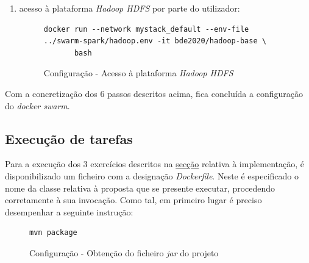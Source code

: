 \documentclass[a4paper]{report}
\begin{document}
{\begin{enumerate}[label=\textbf{\arabic*.}]
                \begin{figure}[H]
                    \centering
                    \begin{verbatim}
streamgen:
    image: streamgen
    command: hdfs:///data/title.ratings.tsv 120
    env_file:
        - ./hadoop.env
    deploy:
        mode: replicated
        replicas: 1
        placement:
            constraints:
                - "node.role==manager"
                    \end{verbatim}
                    \vspace{-5mm}
                    \caption{Configuração - Ficheiro \textit{"docker-compose.yml"} - \textit{streamgen}}
                    \label{fig:11}
                \end{figure}


                \item acesso à plataforma \textit{Hadoop HDFS} por parte do utilizador:
                \begin{figure}[H]
                    \centering
                    \begin{verbatim}
docker run --network mystack_default --env-file ../swarm-spark/hadoop.env -it bde2020/hadoop-base \
       bash
                    \end{verbatim}
                    \vspace{-5mm}
                    \caption{Configuração - Acesso à plataforma \textit{Hadoop HDFS}}
                    \label{fig:13}
                \end{figure}
            \end{enumerate}}

            Com a concretização dos 6 passos descritos acima, fica concluída a configuração do \textit{docker swarm}.
        
        \subsection{Execução de tarefas} \label{subsec:Configuration-Dockerfile}
            Para a execução dos 3 exercícios descritos na \hyperref[ch:Implementation]{secção} relativa à implementação, é disponibilizado um ficheiro com a designação \textit{Dockerfile}.
            Neste é especificado o nome da classe relativa à proposta que se presente executar, procedendo corretamente à sua invocação.
            Como tal, em primeiro lugar é preciso desempenhar a seguinte instrução:
            \begin{figure}[H]
                \centering
                \begin{verbatim}
mvn package
                \end{verbatim}
                \vspace{-5mm}
                \caption{Configuração - Obtenção do ficheiro \textit{jar} do projeto}
                \label{fig:14}
            \end{figure}
            
\end{document}
